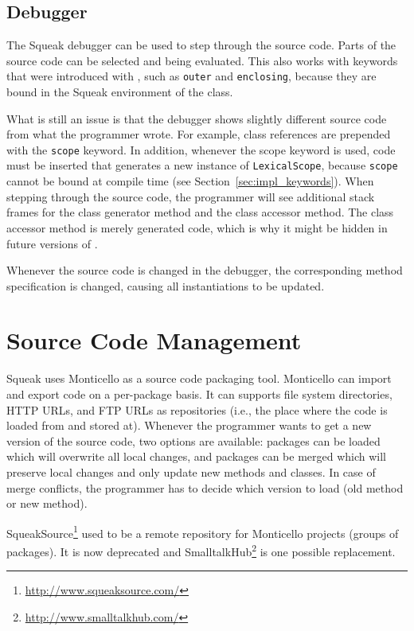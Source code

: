 \subsection{Debugger}
The Squeak debugger can be used to step through the source code. Parts of the source code can be selected and being evaluated. This also works with keywords that were introduced with \msname, such as \texttt{outer} and \texttt{enclosing}, because they are bound in the Squeak environment of the class.

What is still an issue is that the debugger shows slightly different source code from what the programmer wrote. For example, class references are prepended with the \texttt{scope} keyword. In addition, whenever the scope keyword is used, code must be inserted that generates a new instance of \texttt{LexicalScope}, because \texttt{scope} cannot be bound at compile time (see Section~\ref{sec:impl_keywords}). When stepping through the source code, the programmer will see additional stack frames for the class generator method and the class accessor method. The class accessor method is merely generated code, which is why it might be hidden in future versions of \msname.

Whenever the source code is changed in the debugger, the corresponding method specification is changed, causing all instantiations to be updated.

\section{Source Code Management}
\label{sec:impl_scm_chap}
Squeak uses Monticello as a source code packaging tool. Monticello can import and export code on a per-package basis. It can supports file system directories, HTTP URLs, and FTP URLs as repositories (i.e., the place where the code is loaded from and stored at). Whenever the programmer wants to get a new version of the source code, two options are available: packages can be loaded which will overwrite all local changes, and packages can be merged which will preserve local changes and only update new methods and classes. In case of merge conflicts, the programmer has to decide which version to load (old method or new method).

SqueakSource\footnote{\url{http://www.squeaksource.com/}} used to be a remote repository for Monticello projects (groups of packages). It is now deprecated and SmalltalkHub\footnote{\url{http://www.smalltalkhub.com/}} is one possible replacement.

